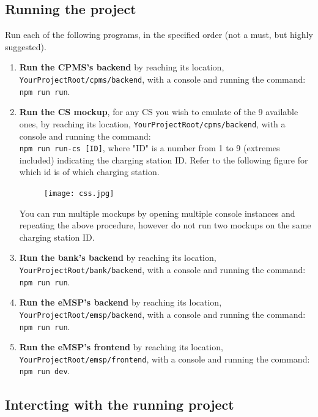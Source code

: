 \documentclass[11pt]{article}
\newcommand{\code}[1]{\colorbox{light-gray}{\texttt{#1}}}
\def\code#1{{\texttt{#1}}}
\begin{document}
\subsection{Running the project}

Run each of the following programs, in the specified order (not a must, but highly suggested).

\begin{enumerate}
    \item \textbf{Run the CPMS's backend} by reaching its location, \code{YourProjectRoot/cpms/backend}, with a console and running the command: \code{npm run run}.
    \item \textbf{Run the CS mockup}, for any CS you wish to emulate of the 9 available ones, by reaching its location, \code{YourProjectRoot/cpms/backend}, with a console and running the command: \\ \code{npm run run-cs [ID]}, where "ID" is a number from 1 to 9 (extremes included) indicating the charging station ID. Refer to the following figure for which id is of which charging station.
    
    \begin{figure}[!ht]
        \centering
        \texttt{[image: css.jpg]}
    \end{figure}
    
    You can run multiple mockups by opening multiple console instances and repeating the above procedure, however do not run two mockups on the same charging station ID.
    
    \item \textbf{Run the bank's backend} by reaching its location, \code{YourProjectRoot/bank/backend}, with a console and running the command: \code{npm run run}.
    \item \textbf{Run the eMSP's backend} by reaching its location, \code{YourProjectRoot/emsp/backend}, with a console and running the command: \code{npm run run}.
    \item \textbf{Run the eMSP's frontend} by reaching its location, \code{YourProjectRoot/emsp/frontend}, with a console and running the command: \code{npm run dev}.
\end{enumerate}

\subsection{Intercting with the running project}
\end{document}
